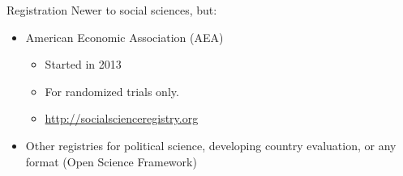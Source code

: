 \documentclass[aspectratio=169]{beamer}
\begin{document}
\begin{frame}{Registration}
 Newer to social sciences, but:
   \begin{itemize}[<.->]
   \item
   	American Economic Association (AEA)
 \begin{itemize}
 \item Started in 2013
 \item For randomized trials only.
 \item \url{http://socialscienceregistry.org}
\end {itemize}
   \item
    Other registries for political science, developing country evaluation, or any format (Open Science Framework)
\end{itemize}
 
\end{frame}

 { %
	\usebackgroundtemplate{}
    \begin{frame}[plain]
     \end{frame}
}
\end{document}

